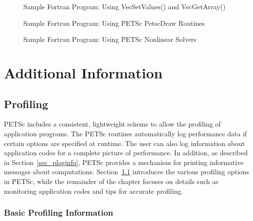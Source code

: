 \begin{figure}[H]
{\small
{}
}
\caption{Sample Fortran Program:  Using VecSetValues() and VecGetArray()}
\label{fig_vec2-Fortran}
\end{figure}

\begin{figure}[H]
{\small
{}
}
\caption{Sample Fortran Program:  Using PETSc PetscDraw Routines}
\label{fig_draw-Fortran}
\end{figure}

\begin{figure}[H]
{\small
{}
}
\caption{Sample Fortran Program:  Using PETSc Nonlinear Solvers}
\label{fig_SNES-Fortran}
\end{figure}

\cleardoublepage
\part{Additional Information}
\label{part_usefulstuff}

\cleardoublepage
\chapter{Profiling} 
\label{ch_profiling} 

PETSc includes a consistent, lightweight scheme to allow the profiling
of application programs.  The PETSc routines automatically log
performance data if certain options are specified at runtime.  The
user can also log information about application codes for a complete
picture of performance.  In addition, as described in
Section~\ref{sec_ploginfo}, PETSc provides a mechanism for printing
informative messages about computations.  Section~\ref{sec_profbasic}
introduces the various profiling options in PETSc, while the
remainder of the chapter focuses on details such as monitoring
application codes and tips for accurate profiling.  

\section{Basic Profiling Information}
\label{sec_profbasic}
   

